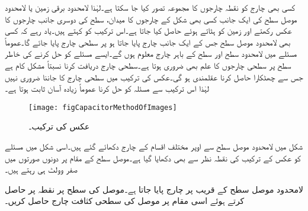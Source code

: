 کسی بھی چارج کو نقطہ چارجوں کا مجموعہ تصور کیا جا سکتا ہے۔لہٰذا لامحدود برقی زمین یا لامحدود موصل سطح  کی ایک جانب کسی بھی شکل کے چارجوں  کا میدان، سطح کی دوسری جانب چارجوں کا عکس رکھتے اور زمین کو ہٹاتے ہوئے حاصل کیا جاتا ہے۔اس ترکیب کو  کہتے ہیں۔یاد رہے کہ کسی بھی لامحدود موصل سطح جس کے ایک جانب چارج پایا جاتا ہو پر سطحی چارج پایا جائے گا۔عموماً مسئلے میں لامحدود سطح اور سطح کے باہر چارج معلوم ہوں گے۔ایسے مسئلے کو حل کرنے کی خاطر سطح پر سطحی چارجوں کا علم بھی ضروری ہوتا ہے۔سطحی چارج دریافت کرنا نسبتاً مشکل کام ہے جس سے چھٹکارا حاصل کرنا عقلمندی ہو گی۔عکس کی ترکیب میں سطحی چارج کا جاننا ضروری نہیں لہٰذا اس ترکیب سے مسئلہ کو حل کرنا عموماً زیادہ آسان ثابت ہوتا ہے۔
\begin{figure}
\centering
\texttt{[image: figCapacitorMethodOfImages]}
\caption{عکس کی ترکیب۔}
\label{شکل_کپیسٹر_عکس_کی_ترکیب}
\end{figure}

شکل   میں لامحدود موصل سطح سے اوپر مختلف اقسام کے چارج دکھائے گئے ہیں۔اسی شکل میں مسئلے کو عکس کے ترکیب کی نقطہ نظر سے بھی دکھایا گیا ہے۔موصل سطح کے مقام پر دونوں صورتوں میں صفر وولٹ ہی رہتے ہیں۔ 

 لامحدود موصل سطح  کے قریب  پر  چارج پایا جاتا ہے۔موصل کی سطح پر نقطہ  پر  حاصل کرتے ہوئے اسی مقام پر موصل کی سطحی کثافت چارج حاصل کریں۔

